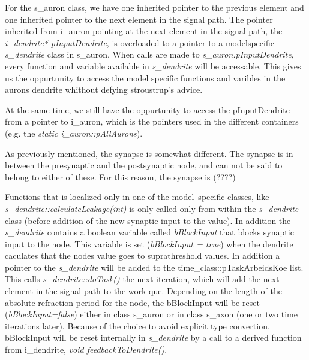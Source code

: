 	For the s\_auron class, we have one inherited pointer to the previous element and one inherited pointer to the next element in the signal path.
	The pointer inherited from i\_auron pointing at the next element in the signal path, the \emph{i\_dendrite* pInputDendrite}, is overloaded to a pointer to a modelspecific \emph{s\_dendrite} class in s\_auron.
	When calls are made to \emph{s\_auron.pInputDendrite}, every function and variable available in \emph{s\_dendrite} will be accessable.
	This gives us the oppurtunity to access the model specific functions and varibles in the aurons dendrite whithout defying stroustrup's advice.

	At the same time, we still have the oppurtunity to access the pInputDendrite from a pointer to i\_auron, which is the pointers used in the different containers (e.g. the \emph{static i\_auron::pAllAurons}).
	
	As previously mentioned, the synapse is somewhat different. The synapse is in between the presynaptic and the postsynaptic node, and can not be said to belong to either of these. 
	For this reason, the synapse is (????)%




	Functions that is localized only in one of the model--specific classes, like \emph{s\_dendrite::calculateLeakage(int)} is only called only from within the \emph{s\_dendrite} class (before addition of the new synaptic input to the value).
	In addition the \emph{s\_dendrite} contains a boolean variable called \emph{bBlockInput} that blocks synaptic input to the node. 
	This variable is set (\emph{bBlockInput = true}) when the dendrite caculates that the nodes value goes to suprathreshold values. In addition a pointer to the \emph{s\_dendrite} will be added to the time\_class::pTaskArbeidsKoe list.
	This calls \emph{s\_dendrite::doTask()} the next iteration, which will add the next element in the signal path to the work que.
	Depending on the length of the absolute refraction period for the node, the bBlockInput will be reset (\emph{bBlockInput=false}) either in class s\_auron or in class s\_axon (one or two time iterations later).
	Because of the choice to avoid explicit type convertion, bBlockInput will be reset internally in \emph{s\_dendrite} by a call to a derived function from i\_dendrite, \emph{void feedbackToDendrite()}.

